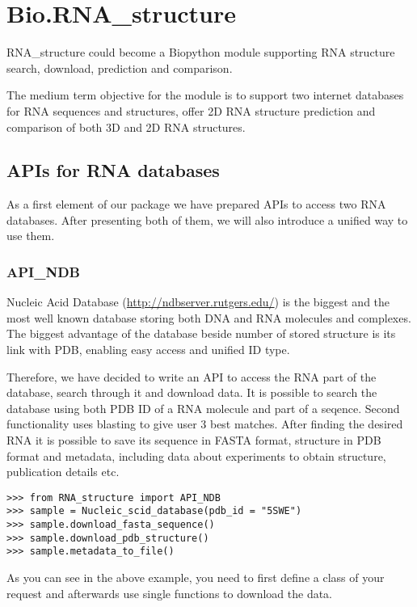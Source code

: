 \chapter{Bio.RNA_structure}

RNA_structure could become a Biopython module supporting RNA structure search, download,
prediction and comparison.

The medium term objective for the module is to support two internet databases
for RNA sequences and structures, offer 2D RNA structure prediction
and comparison of both 3D and 2D RNA structures.

\section{APIs for RNA databases}

As a first element of our package we have prepared APIs to access two RNA
databases. After presenting both of them, we will also introduce a unified
way to use them.

\subsection{API_NDB}

Nucleic Acid Database (\url{http://ndbserver.rutgers.edu/}) is the biggest
and the most well known database storing both DNA and RNA molecules and complexes.
The biggest advantage of the database beside number of stored structure
is its link with PDB, enabling easy access and unified ID type.

Therefore, we have decided to write an API to access the RNA part of the database,
search through it and download data. It is possible to search the database using
both PDB ID of a RNA molecule and part of a seqence. Second functionality
uses blasting to give user 3 best matches. After finding the desired RNA
it is possible to save its sequence in FASTA format, structure in PDB format
and metadata, including data about experiments to obtain structure, publication
details etc.

\begin{verbatim}
>>> from RNA_structure import API_NDB
>>> sample = Nucleic_scid_database(pdb_id = "5SWE")
>>> sample.download_fasta_sequence()
>>> sample.download_pdb_structure()
>>> sample.metadata_to_file()
\end{verbatim}

As you can see in the above example, you need to first define a class of your
request and afterwards use single functions to download the data.

